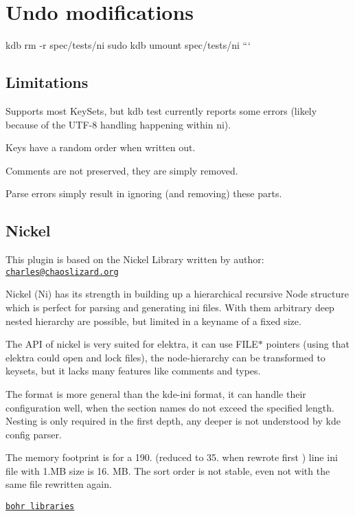 \section*{Undo modifications}

kdb rm -\/r spec/tests/ni sudo kdb umount spec/tests/ni ```

\subsection*{Limitations}


\begin{DoxyItemize}
\item Supports most Key\+Sets, but {\ttfamily kdb test} currently reports some errors (likely because of the U\+T\+F-\/8 handling happening within ni).
\item Keys have a random order when written out.
\item Comments are not preserved, they are simply removed.
\item Parse errors simply result in ignoring (and removing) these parts.
\end{DoxyItemize}

\subsection*{Nickel}

This plugin is based on the Nickel Library written by author\+: \href{mailto:charles@chaoslizard.org}{\tt charles@chaoslizard.\+org}

Nickel (Ni) has its strength in building up a hierarchical recursive Node structure which is perfect for parsing and generating ini files. With them arbitrary deep nested hierarchy are possible, but limited in a keyname of a fixed size.

The A\+PI of nickel is very suited for elektra, it can use {\ttfamily F\+I\+L\+E$\ast$} pointers (using that elektra could open and lock files), the node-\/hierarchy can be transformed to keysets, but it lacks many features like comments and types.

The format is more general than the kde-\/ini format, it can handle their configuration well, when the section names do not exceed the specified length. Nesting is only required in the first depth, any deeper is not understood by kde config parser.

The memory footprint is for a 190. (reduced to 35. when rewrote first ) line ini file with 1.\+MB size is 16. MB. The sort order is not stable, even not with the same file rewritten again.

\href{https://github.com/chazomaticus/bohr}{\tt bohr libraries} 
